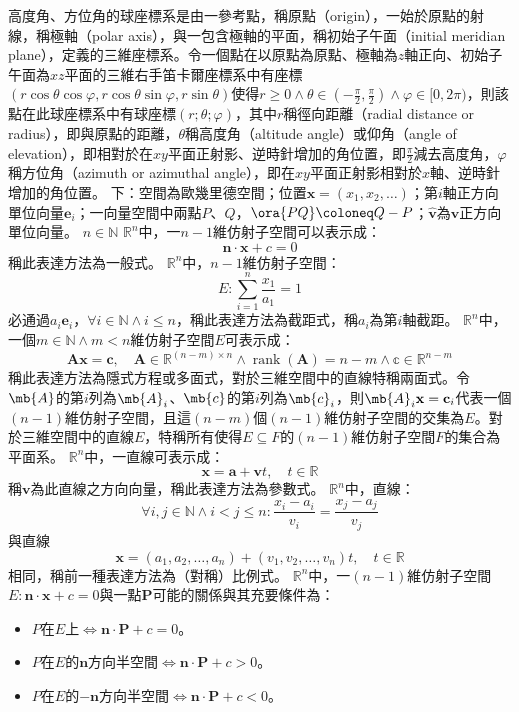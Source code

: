 \documentclass[a4paper,12pt]{report}
\begin{document}
高度角、方位角的球座標系是由一參考點，稱原點（origin），一始於原點的射線，稱極軸（polar axis），與一包含極軸的平面，稱初始子午面（initial meridian plane），定義的三維座標系。令一個點在以原點為原點、極軸為$z$軸正向、初始子午面為$xz$平面的三維右手笛卡爾座標系中有座標$(r\cos\theta\cos\varphi,r\cos\theta\sin\varphi,r\sin\theta)$使得$r\geq 0\land\theta\in(-\frac{\pi}{2},\frac{\pi}{2})\land\varphi\in[0,2\pi)$，則該點在此球座標系中有球座標$(r;\theta;\varphi)$，其中$r$稱徑向距離（radial distance or radius），即與原點的距離，$\theta$稱高度角（altitude angle）或仰角（angle of elevation），即相對於在$xy$平面正射影、逆時針增加的角位置，即$\frac{\pi}{2}$減去高度角，$\varphi$稱方位角（azimuth or azimuthal angle），即在$xy$平面正射影相對於$x$軸、逆時針增加的角位置。
下：空間為歐幾里德空間；位置$\mathbf{x}=(x_1,x_2,\ldots)$；第$i$軸正方向單位向量$\mathbf{e}_i$；一向量空間中兩點$P$、$Q$，$\ora{PQ}\coloneq Q-P$；$\hat{\mathbf{v}}$為$\mathbf{v}$正方向單位向量。
$n\in\mathbb{N}$
$\mathbb{R}^n$中，一$n-1$維仿射子空間可以表示成：
\[\mathbf{n}\cdot\mathbf{x}+c=0\]
稱此表達方法為一般式。
$\mathbb{R}^n$中，$n-1$維仿射子空間：
\[E\colon\sum_{i=1}^n\frac{x_1}{a_1}=1\]
必通過$a_i\mathbf{e}_i$，$\forall i\in\mathbb{N}\land i\leq n$，稱此表達方法為截距式，稱$a_i$為第$i$軸截距。
$\mathbb{R}^n$中，一個$m\in\mathbb{N}\land m<n$維仿射子空間$E$可表示成：
\[\mathbf{A}\mathbf{x}=\mathbf{c},\quad\mathbf{A}\in\mathbb{R}^{(n-m)\times n}\land\operatorname{rank}(\mathbf{A})=n-m\land\mathbb{c}\in\mathbb{R}^{n-m}\]
稱此表達方法為隱式方程或多面式，對於三維空間中的直線特稱兩面式。令$\mb{A}$的第$i$列為$\mb{A}_i$、$\mb{c}$的第$i$列為$\mb{c}_i$，則$\mb{A}_i\mathbf{x}=\mathbf{c}_i$代表一個$(n-1)$維仿射子空間，且這$(n-m)$個$(n-1)$維仿射子空間的交集為$E$。對於三維空間中的直線$E$，特稱所有使得$E\subseteq F$的$(n-1)$維仿射子空間$F$的集合為平面系。
$\mathbb{R}^n$中，一直線可表示成：
\[\mathbf{x}=\mathbf{a}+\mathbf{v}t,\quad t\in\mathbb{R}\]
稱$\mathbf{v}$為此直線之方向向量，稱此表達方法為參數式。
$\mathbb{R}^n$中，直線：
\[\forall i,j\in\mathbb{N}\land i<j\leq n\colon\frac{x_i-a_i}{v_i}=\frac{x_j-a_j}{v_j}\]
與直線
\[\mathbf{x}=(a_1,a_2,\ldots,a_n)+(v_1,v_2,\ldots,v_n)t,\quad t\in\mathbb{R}\]
相同，稱前一種表達方法為（對稱）比例式。
$\mathbb{R}^n$中，一$(n-1)$維仿射子空間$E\colon\mathbf{n}\cdot\mathbf{x}+c=0$與一點$\mathbf{P}$可能的關係與其充要條件為：
\begin{itemize}
\item $P$在$E$上$\iff\mathbf{n}\cdot\mathbf{P}+c=0$。
\item $P$在$E$的$\mathbf{n}$方向半空間$\iff\mathbf{n}\cdot\mathbf{P}+c>0$。
\item $P$在$E$的$-\mathbf{n}$方向半空間$\iff\mathbf{n}\cdot\mathbf{P}+c<0$。
\end{itemize}
\end{document}
